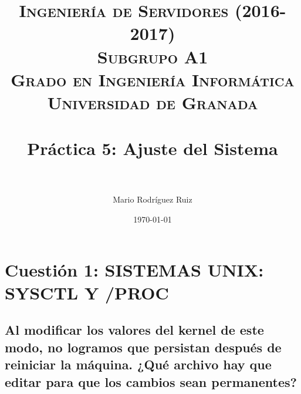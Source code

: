 


\title{	
\normalfont \normalsize 
\textsc{\textbf{Ingeniería de Servidores (2016-2017)} \\ Subgrupo A1 \\ Grado en Ingeniería Informática\\ Universidad de Granada} \\ [25pt] %
\horrule{0.5pt} \\[0.4cm] %
\huge Práctica 5: Ajuste del Sistema \\ %
\horrule{2pt} \\[0.5cm] %
}

\author{Mario Rodríguez Ruiz} %

\date{\normalsize\today} %




\maketitle %

\newpage %

\tableofcontents %

\listoffigures

\listoftables

\newpage


\section{Cuestión 1: SISTEMAS UNIX: SYSCTL Y /PROC}
\subsection{Al modificar los valores del kernel de este modo, no logramos
	que persistan después de reiniciar la máquina. ¿Qué archivo hay que editar
	para que los cambios sean permanentes?}

